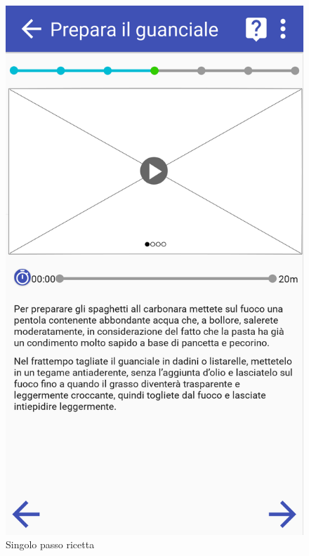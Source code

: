 \begin{figure}[H]
\begin{minipage}{.49\textwidth}
		\includegraphics[width=\textwidth]{img/wireframe/presentazione_passo_ricetta_timer_non_attivo.png}
		\caption{Singolo passo ricetta}
		\label{fig:singolo_passo}
	\end{minipage}
\end{figure}	
